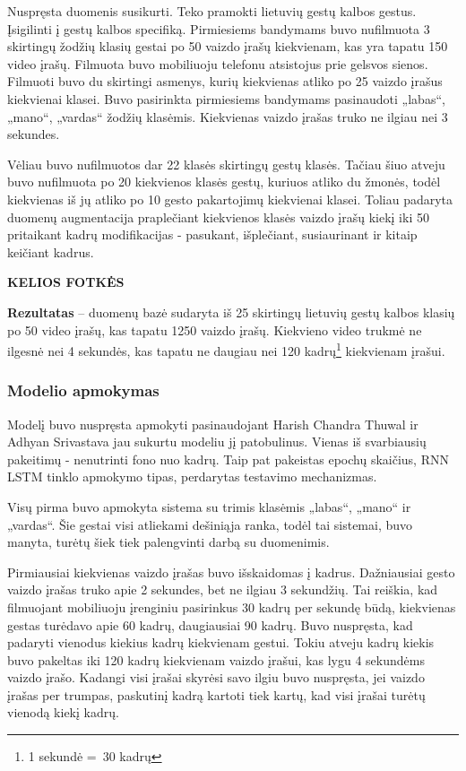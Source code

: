 \documentclass{VUMIFPSbakalaurinis}
\begin{document}
Nuspręsta duomenis susikurti. Teko pramokti lietuvių gestų kalbos gestus. Įsigilinti į gestų kalbos specifiką. Pirmiesiems bandymams buvo nufilmuota 3 skirtingų žodžių klasių gestai po 50 vaizdo įrašų kiekvienam, kas yra tapatu 150 video įrašų. Filmuota buvo mobiliuoju telefonu atsistojus prie gelsvos sienos. Filmuoti buvo du skirtingi asmenys, kurių kiekvienas atliko po 25 vaizdo įrašus kiekvienai klasei. Buvo pasirinkta pirmiesiems bandymams pasinaudoti „labas“, „mano“, „vardas“ žodžių klasėmis. Kiekvienas vaizdo įrašas truko ne ilgiau nei 3 sekundes.

Vėliau buvo nufilmuotos dar 22 klasės skirtingų gestų klasės. Tačiau šiuo atveju buvo nufilmuota po 20 kiekvienos klasės gestų, kuriuos atliko du žmonės, todėl kiekvienas iš jų atliko po 10 gesto pakartojimų kiekvienai klasei. Toliau padaryta duomenų augmentacija praplečiant kiekvienos klasės vaizdo įrašų kiekį iki 50 pritaikant kadrų modifikacijas - pasukant, išplečiant, susiaurinant ir kitaip keičiant kadrus.

\textbf{KELIOS FOTKĖS}

\textbf{Rezultatas} – duomenų bazė sudaryta iš 25 skirtingų lietuvių gestų kalbos klasių po 50 video įrašų, kas tapatu 1250 vaizdo įrašų. Kiekvieno video trukmė ne ilgesnė nei 4 sekundės, kas tapatu ne daugiau nei 120 kadrų\footnote{1 sekundė = 30 kadrų} kiekvienam įrašui.

\subsubsection{Modelio apmokymas}

Modelį buvo nuspręsta apmokyti pasinaudojant Harish Chandra Thuwal ir Adhyan Srivastava jau sukurtu modeliu jį patobulinus. Vienas iš svarbiausių pakeitimų - nenutrinti fono nuo kadrų. Taip pat pakeistas epochų skaičius, RNN LSTM tinklo apmokymo tipas, perdarytas testavimo mechanizmas.

Visų pirma buvo apmokyta sistema su trimis klasėmis „labas“, „mano“ ir „vardas“. Šie gestai visi atliekami dešiniąja ranka, todėl tai sistemai, buvo manyta, turėtų šiek tiek palengvinti darbą su duomenimis.

Pirmiausiai kiekvienas vaizdo įrašas buvo išskaidomas į kadrus. Dažniausiai gesto vaizdo įrašas truko apie 2 sekundes, bet ne ilgiau 3 sekundžių. Tai reiškia, kad filmuojant mobiliuoju įrenginiu pasirinkus 30 kadrų per sekundę būdą, kiekvienas gestas turėdavo apie 60 kadrų, daugiausiai 90 kadrų. Buvo nuspręsta, kad padaryti vienodus kiekius kadrų kiekvienam gestui. Tokiu atveju kadrų kiekis buvo pakeltas iki 120 kadrų kiekvienam vaizdo įrašui, kas lygu 4 sekundėms vaizdo įrašo. Kadangi visi įrašai skyrėsi savo ilgiu buvo nuspręsta, jei vaizdo įrašas per trumpas, paskutinį kadrą kartoti tiek kartų, kad visi įrašai turėtų vienodą kiekį kadrų. 
\end{document}
